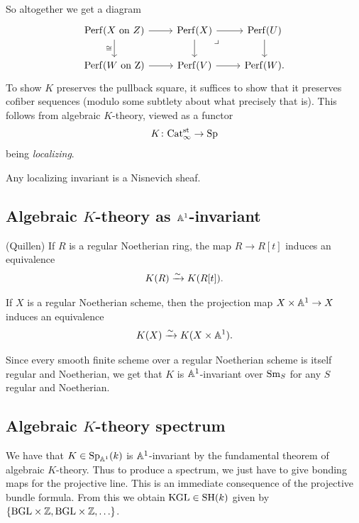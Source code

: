 \documentclass[11pt,openany]{book}
\begin{document}
So altogether we get a diagram
\[ \begin{tikzcd}
    \Perf(X\text{ on }Z)\rar\dar["\cong" left] & \Perf(X)\rar\dar\pb & \Perf(U)\dar\\
    \Perf(W\text{ on Z})\rar & \Perf(V)\rar & \Perf(W).
\end{tikzcd} \]
To show $K$ preserves the pullback square, it suffices to show that it preserves cofiber sequences (modulo some subtlety about what precisely that is). This follows from algebraic $K$-theory, viewed as a functor
\begin{align*}
    K \colon \mathrm{Cat}_\infty^{\mathrm{st}} \to \mathrm{Sp}
\end{align*}
being \textit{localizing}.

\begin{corollary} Any localizing invariant is a Nisnevich sheaf.
\end{corollary}

\subsection{Algebraic $K$-theory as $\mathbb{A}^1$-invariant}

\begin{theorem} \cite[p.~38]{Quillen-K1} (Quillen) If $R$ is a regular Noetherian ring, the map $R \to R[t]$ induces an equivalence
\begin{align*}
    K(R) \xrightarrow{\sim} K(R[t]).
\end{align*}
\end{theorem}

\begin{theorem} \cite[6.8]{TT} If $X$ is a regular Noetherian scheme, then the projection map $X \times \mathbb{A}^1 \to X$ induces an equivalence
\begin{align*}
    K(X) \xrightarrow{\sim} K(X \times \mathbb{A}^1).
\end{align*}
\end{theorem}

Since every smooth finite scheme over a regular Noetherian scheme is itself regular and Noetherian, we get that $K$ is $\mathbb{A}^1$-invariant over $\mathrm{Sm}_S$ for any $S$ regular and Noetherian.

\subsection{Algebraic $K$-theory spectrum}


We have that $K \in \mathrm{Sp}_{\mathbb{A}^1}(k)$ is $\mathbb{A}^1$-invariant by the fundamental theorem of algebraic $K$-theory. Thus to produce a spectrum, we just have to give bonding maps for the projective line. This is an immediate consequence of the projective bundle formula. From this we obtain $\mathrm{KGL} \in \mathrm{SH}(k)$ given by $\left\{ \mathrm{BGL} \times \mathbb{Z}, \mathrm{BGL} \times \mathbb{Z}, \ldots \right\}$.
\end{document}
